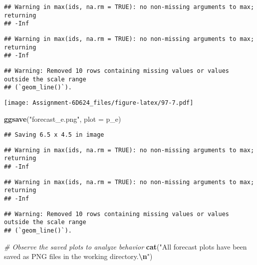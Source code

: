 \documentclass[
]{article}
\newenvironment{Shaded}{\begin{snugshade}}{\end{snugshade}}
\newcommand{\AttributeTok}[1]{\textcolor[rgb]{0.13,0.29,0.53}{#1}}
\newcommand{\CommentTok}[1]{\textcolor[rgb]{0.56,0.35,0.01}{\textit{#1}}}
\newcommand{\FunctionTok}[1]{\textcolor[rgb]{0.13,0.29,0.53}{\textbf{#1}}}
\newcommand{\NormalTok}[1]{#1}
\newcommand{\SpecialCharTok}[1]{\textcolor[rgb]{0.81,0.36,0.00}{\textbf{#1}}}
\newcommand{\StringTok}[1]{\textcolor[rgb]{0.31,0.60,0.02}{#1}}
\begin{document}
\begin{verbatim}
## Warning in max(ids, na.rm = TRUE): no non-missing arguments to max; returning
## -Inf
\end{verbatim}

\begin{verbatim}
## Warning in max(ids, na.rm = TRUE): no non-missing arguments to max; returning
## -Inf
\end{verbatim}

\begin{verbatim}
## Warning: Removed 10 rows containing missing values or values outside the scale range
## (`geom_line()`).
\end{verbatim}

\texttt{[image: Assignment-6D624\_files/figure-latex/97-7.pdf]}

\begin{Shaded}
\begin{Highlighting}[]
\FunctionTok{ggsave}\NormalTok{(}\StringTok{"forecast\_e.png"}\NormalTok{, }\AttributeTok{plot =}\NormalTok{ p\_e)}
\end{Highlighting}
\end{Shaded}

\begin{verbatim}
## Saving 6.5 x 4.5 in image
\end{verbatim}

\begin{verbatim}
## Warning in max(ids, na.rm = TRUE): no non-missing arguments to max; returning
## -Inf
\end{verbatim}

\begin{verbatim}
## Warning in max(ids, na.rm = TRUE): no non-missing arguments to max; returning
## -Inf
\end{verbatim}

\begin{verbatim}
## Warning: Removed 10 rows containing missing values or values outside the scale range
## (`geom_line()`).
\end{verbatim}

\begin{Shaded}
\begin{Highlighting}[]
\CommentTok{\# Observe the saved plots to analyze behavior}
\FunctionTok{cat}\NormalTok{(}\StringTok{"All forecast plots have been saved as PNG files in the working directory.}\SpecialCharTok{\textbackslash{}n}\StringTok{"}\NormalTok{)}
\end{Highlighting}
\end{Shaded}
\end{document}
